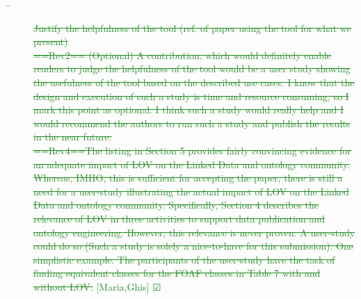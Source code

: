 \documentclass[a4paper,notitlepage]{article}
\newcommand\done[2]{ \item[--]\textcolor{ForestGreen}{\st{#1}} \hfill\textcolor{ForestGreen}{[#2] $\CheckedBox$}}%
\begin{document}
\begin{description}
 \done{Justify the helpfulness of the tool (ref. of paper using the tool for what we present) \\
==Rev2== (Optional) A contribution, which would definitely enable readers to judge the helpfulness of the tool would be a user study showing the usefulness of the tool based on the described use cases. I know that the design and execution of such a study is time and resource consuming, so I mark this point as optional. I think such a study would really help and I would recommend the authors to run such a study and publish the results in the near future.\\
==Rev4==The listing in Section 5 provides fairly convincing evidence for an adequate impact of LOV on the Linked Data and ontology community. Whereas, IMHO, this is sufficient for accepting the paper, there is still a need for a user-study illustrating the actual impact of LOV on the Linked Data and ontology community. Specifically, Section 4 describes the relevance of LOV in three activities to support data publication and ontology engineering. However, this relevance is never proven. A user-study could do so (Such a study is solely a nice-to-have for this submission). One simplistic example: The participants of the user-study have the task of finding equivalent classes for the FOAF classes in Table 7 with and without LOV.}{Maria,Ghis}
\end{description}
\end{document}
